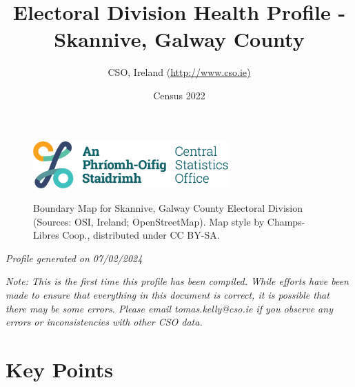 \documentclass{article}
\title{Electoral Division Health Profile - Skannive, Galway County}
\date{Census 2022}
\author{CSO, Ireland  (\url{http://www.cso.ie)}}
\begin{document}


\begin{figure}
	\centering
\includegraphics[width =75mm]{../figures/CSO_Logo.png}
\end{figure}

\begin{figure}[h]
	\centering
	\setlength{\fboxsep}{1pt}
	\caption{\normalsize Boundary Map for Skannive, Galway County Electoral Division (Sources: OSI, Ireland; OpenStreetMap). Map style by Champs-Libres Coop., distributed under CC BY-SA.}
	\label{fig:2ae19629-1a6a-13a3-e055-000000000001}
	\end{figure}
	{\let\newpage\relax\maketitle}
	     \begin{center}
         \emph{Profile generated on 07/02/2024}
     \end{center}
     	     \begin{center}
        \emph{Note: This is the first time this profile has been compiled. While efforts have been made to ensure that everything in this document is correct, it is possible that there may be some errors. Please email tomas.kelly@cso.ie if you observe any errors or inconsistencies with other CSO data.}
     \end{center}
  \pagebreak
    	    \tableofcontents

\pagebreak


\section{Key Points}
\end{document}
